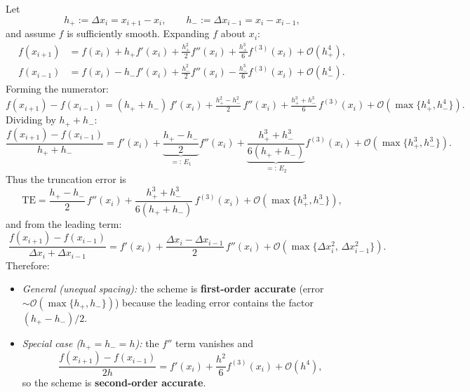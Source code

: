\begin{solution}
    Let
    \[
        h_+ := \Delta x_i = x_{i+1} - x_i, \qquad
        h_- := \Delta x_{i-1} = x_i - x_{i-1},
    \]
    and assume $f$ is sufficiently smooth.  Expanding $f$ about $x_i$:
    \[
        \begin{aligned}
        f(x_{i+1}) &= f(x_i) + h_+ f'(x_i) + \tfrac{h_+^2}{2} f''(x_i)
            + \tfrac{h_+^3}{6} f^{(3)}(x_i) + \mathcal{O}(h_+^4),\\[4pt]
        f(x_{i-1}) &= f(x_i) - h_- f'(x_i) + \tfrac{h_-^2}{2} f''(x_i)
            - \tfrac{h_-^3}{6} f^{(3)}(x_i) + \mathcal{O}(h_-^4).
        \end{aligned}
    \]
    Forming the numerator:
    \[
        f(x_{i+1}) - f(x_{i-1})
        = (h_+{+}h_-)\,f'(x_i)
        + \tfrac{h_+^2 - h_-^2}{2}\,f''(x_i)
        + \tfrac{h_+^3 + h_-^3}{6}\,f^{(3)}(x_i)
        + \mathcal{O}(\max\{h_+^4,h_-^4\}).
    \]
    Dividing by $h_+ + h_-$:
    \[
        \frac{f(x_{i+1})-f(x_{i-1})}{h_++h_-}
        = f'(x_i)
        + \underbrace{\frac{h_+-h_-}{2}}_{\displaystyle=:\,E_1} f''(x_i)
        + \underbrace{\frac{h_+^3+h_-^3}{6(h_++h_-)}}_{\displaystyle=:\,E_2}
        f^{(3)}(x_i)
        + \mathcal{O}(\max\{h_+^3,h_-^3\}).
    \]
    Thus the truncation error is
    \[
        \mathrm{TE}
        = \frac{h_+-h_-}{2}\,f''(x_i)
        + \frac{h_+^3+h_-^3}{6(h_++h_-)}\,f^{(3)}(x_i)
        + \mathcal{O}(\max\{h_+^3,h_-^3\}),
    \]
    and from the leading term:
    \[
        \boxed{\;
        \frac{f(x_{i+1})-f(x_{i-1})}{\Delta x_i+\Delta x_{i-1}}
        = f'(x_i)
        + \frac{\Delta x_i - \Delta x_{i-1}}{2}\,f''(x_i)
        + \mathcal{O}\!\left(\max\{\Delta x_i^2,\,\Delta x_{i-1}^2\}\right).
        \;}
    \]
    Therefore:
    \begin{itemize}
        \item \emph{General (unequal spacing):} the scheme is
        \textbf{first-order accurate} (error $\sim\mathcal{O}(\max\{h_+,h_-\})$)
        because the leading error contains the factor $(h_+-h_-)/2$.

        \item \emph{Special case ($h_+=h_-=h$):} the $f''$ term vanishes and
        \[
            \frac{f(x_{i+1})-f(x_{i-1})}{2h}
            = f'(x_i) + \frac{h^2}{6}f^{(3)}(x_i) + \mathcal{O}(h^4),
        \]
        so the scheme is \textbf{second-order accurate}.
    \end{itemize}
\end{solution}

